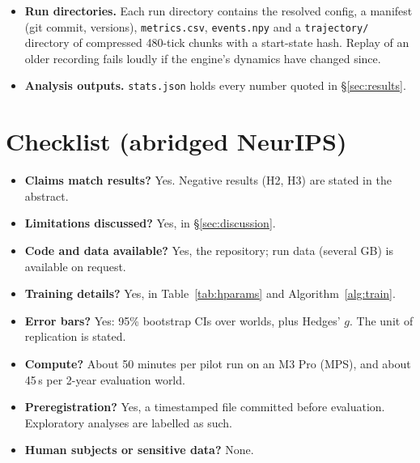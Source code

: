 \documentclass[10pt]{article}
\begin{document}
\begin{itemize}
\item \textbf{Run directories.} Each run directory contains the resolved config, a manifest (git commit, versions),
\texttt{metrics.csv}, \texttt{events.npy} and a \texttt{trajectory/} directory of compressed 480-tick chunks with a
start-state hash. Replay of an older recording fails loudly if the engine's dynamics have changed since.
\item \textbf{Analysis outputs.} \texttt{stats.json} holds every number quoted in \S\ref{sec:results}.
\end{itemize}

\section{Checklist (abridged NeurIPS)}
\begin{itemize}
\item \textbf{Claims match results?} Yes. Negative results (H2, H3) are stated in the abstract.
\item \textbf{Limitations discussed?} Yes, in \S\ref{sec:discussion}.
\item \textbf{Code and data available?} Yes, the repository; run data (several GB) is available on request.
\item \textbf{Training details?} Yes, in Table~\ref{tab:hparams} and Algorithm~\ref{alg:train}.
\item \textbf{Error bars?} Yes: 95\% bootstrap CIs over worlds, plus Hedges' $g$. The unit of replication is stated.
\item \textbf{Compute?} About 50 minutes per pilot run on an M3 Pro (MPS), and about 45\,s per 2-year evaluation
world.
\item \textbf{Preregistration?} Yes, a timestamped file committed before evaluation. Exploratory analyses are
labelled as such.
\item \textbf{Human subjects or sensitive data?} None.
\end{itemize}
\end{document}
